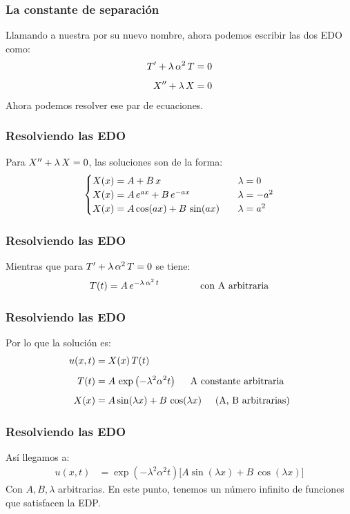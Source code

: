 \documentclass[12pt]{beamer}
\begin{document}
\begin{frame}
\frametitle{La constante de separación}
Llamando a nuestra  por su nuevo nombre, ahora podemos escribir las dos EDO como:
\begin{align*}
{T}^{\prime} + \lambda \, \alpha^{2} \, T &= 0 \\[0.5em]
{X}^{\prime \prime} + \lambda \, X &= 0
\end{align*}
\pause
Ahora podemos resolver ese par de ecuaciones.
\end{frame}
\begin{frame}
\frametitle{Resolviendo las EDO}
Para ${X}^{\prime \prime} + \lambda \, X = 0$, las soluciones son de la forma:
\pause
\begin{align}
\begin{cases}
X (x) = A + B \, x & \hspace{0.2cm} \lambda = 0 \\
X (x) = A \, e^{a x} + B \, e^{-a x} & \hspace{0.2cm} \lambda = - a^{2} \\
X (x) = A \cos (a x ) + B \, \sin (a x) & \hspace{0.2cm} \lambda = a^{2}
\end{cases}
\label{eq:ecuacion_06_02_31}
\end{align}
\end{frame}
\begin{frame}
\frametitle{Resolviendo las EDO}
Mientras que para ${T}^{\prime} + \lambda \, \alpha^{2} \, T = 0$ se tiene:
\pause
\begin{align}
T (t) = A \, e^{- \lambda \, \alpha^{2} \, t} \hspace{1.5cm} \mbox{con A arbitraria}
\label{eq:ecuacion_06_02_36a}    
\end{align}
\end{frame}
\begin{frame}
\frametitle{Resolviendo las EDO}
Por lo que la solución es:
\begin{align*}
u (x, t) &= X (x) \, T (t) \\[0.5em]
T (t) &= A \, \exp\left( -\lambda^{2} \alpha^{2} t \right)  \hspace{0.5cm} \text{A constante arbitraria} \\[0.5em]
X (x) &= A \sin (\lambda x ) + B \, \cos (\lambda x) \hspace{0.5cm} \text{(A, B arbitrarias)}
\end{align*}
\end{frame}
\begin{frame}
\frametitle{Resolviendo las EDO}
Así llegamos a:
\pause
\begin{align*}
u (x, t) &= \exp\left( -\lambda^{2} \alpha^{2} t \right)  \bigg[  A \sin (\lambda x ) + B \, \cos (\lambda x) \bigg]
\end{align*}
Con $A, B, \lambda$ arbitrarias. \pause En este punto, tenemos un número infinito de funciones que satisfacen la EDP.
\end{frame}
\end{document}
